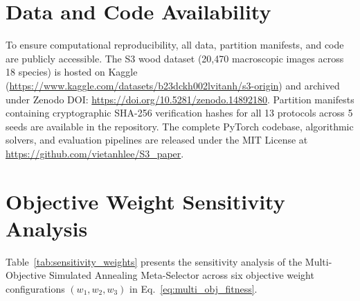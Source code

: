 \documentclass[a4paper,fleqn]{cas-sc}
\begin{document}
\section*{Data and Code Availability}
To ensure computational reproducibility, all data, partition manifests, and code are publicly accessible. The S3 wood dataset (20,470 macroscopic images across 18 species) is hosted on Kaggle (\url{https://www.kaggle.com/datasets/b23dckh002lvitanh/s3-origin}) and archived under Zenodo DOI: \url{https://doi.org/10.5281/zenodo.14892180}. Partition manifests containing cryptographic SHA-256 verification hashes for all 13 protocols across 5 seeds are available in the repository. The complete PyTorch codebase, algorithmic solvers, and evaluation pipelines are released under the MIT License at \url{https://github.com/vietanhlee/S3_paper}.

\appendix
\section{Objective Weight Sensitivity Analysis}
\label{app:sensitivity}

Table~\ref{tab:sensitivity_weights} presents the sensitivity analysis of the Multi-Objective Simulated Annealing Meta-Selector across six objective weight configurations $(w_1, w_2, w_3)$ in Eq.~\eqref{eq:multi_obj_fitness}.
\end{document}
